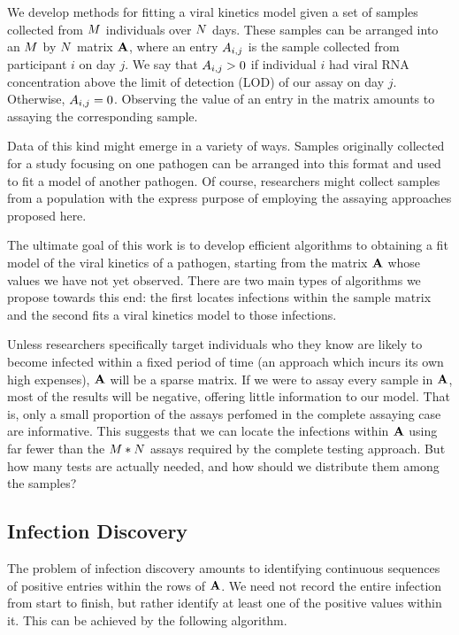 We develop methods for fitting a viral kinetics model given a set of  samples collected from $M$ individuals over $N$ days.
These samples can be arranged into an $M$ by $N$ matrix $\mathbf{A}$, where an entry $A_{i,j}$ is the sample collected from participant $i$ on day $j$.
We say that $A_{i,j} > 0$ if individual $i$ had viral RNA concentration above the limit of detection (LOD) of our assay on day $j$.
Otherwise, $A_{i,j} = 0$. 
Observing the value of an entry in the matrix amounts to assaying the corresponding sample.

Data of this kind might emerge in a variety of ways.
Samples originally collected for a study focusing on one pathogen can be arranged into this format and used to fit a model of another pathogen.
Of course, researchers might collect samples from a population with the express purpose of employing the assaying approaches proposed here.

The ultimate goal of this work is to develop efficient algorithms to obtaining a fit model of the viral kinetics of a pathogen, starting from the matrix $\mathbf{A}$ whose values we have not yet observed. 
There are two main types of algorithms we propose towards this end: the first locates infections within the sample matrix and the second fits a viral kinetics model to those infections.

Unless researchers specifically target individuals who they know are likely to become infected within a fixed period of time (an approach which incurs its own high expenses), $\mathbf{A}$ will be a sparse matrix.
If we were to assay every sample in $\mathbf{A}$, most of the results will be negative, offering little information to our model.
That is, only a small proportion of the assays perfomed in the complete assaying case are informative.
This suggests that we can locate the infections within $\mathbf{A}$ using far fewer than the $M * N$ assays required by the complete testing approach.
But how many tests are actually needed, and how should we distribute them among the samples?

\subsection{Infection Discovery}
The problem of infection discovery amounts to identifying continuous sequences of positive entries within the rows of $\mathbf{A}$.
We need not record the entire infection from start to finish, but rather identify at least one of the positive values within it.
This can be achieved by the following algorithm.


